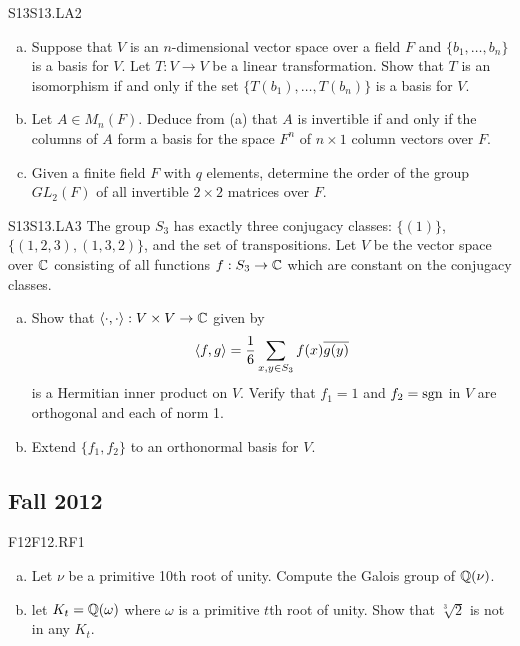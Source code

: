 \documentclass[../AlgebraQualSolutions.tex]{subfiles}
\begin{document}
\begin{prob}{S13}{S13.LA2}

	\begin{enumerate}[(a)]
		\item Suppose that $V$ is an $n$-dimensional vector space over a field $F$ and $\{b_1, \ldots, b_n\}$ is a basis for $V$. Let $T: V \to V$ be a linear transformation. Show that $T$ is an isomorphism if and only if the set $\{T(b_1), \ldots, T(b_n)\}$ is a basis for $V$.
		\item Let $A \in M_n(F)$. Deduce from (a) that $A$ is invertible if and only if the columns of $A$ form a basis for the space $F^n$  of $n \times 1$ column vectors over $F$.
		\item Given a finite field $F$ with $q$ elements, determine the order of the group $GL_2(F)$ of all invertible $2 \times 2$ matrices over $F$.
	\end{enumerate}
\end{prob}

\begin{prob}{S13}{S13.LA3}
The group $S_3$ has exactly three conjugacy classes: $\{(1)\}$, $\{(1,2,3), (1,3,2)\}$, and the set of transpositions. Let $V$ be the vector space over $\mathbb{C}$ consisting of all functions $f:S_3 \to \mathbb{C}$ which are constant on the conjugacy classes.
	\begin{enumerate}[(a)]
		\item Show that $\langle \cdot, \cdot\rangle: V \times V \to \mathbb{C}$ given by 
			\[\langle f, g\rangle = \frac{1}{6} \sum_{x,y \in S_3} f(x) \overline{g(y)}\]
		is a Hermitian inner product on $V$. Verify that $f_1 = 1$ and $f_2 = \rm{sgn}$ in $V$ are orthogonal and each of norm 1. 
	\item Extend $\{f_1, f_2\}$ to an orthonormal basis for $V$.
	\end{enumerate}
\end{prob}


\subsection{Fall 2012}

\begin{prob}{F12}{F12.RF1}
\begin{enumerate}[(a)]
\item Let $\nu$ be a primitive 10th root of unity. Compute the Galois group of $\mathbb{Q}(\nu)$.
\item let $K_t = \mathbb{Q}(\omega)$ where $\omega$ is a primitive $t$th root of unity. Show that $\sqrt[3]{2}$ is not in any $K_t$.
\end{enumerate}
\end{prob}
\end{document}
